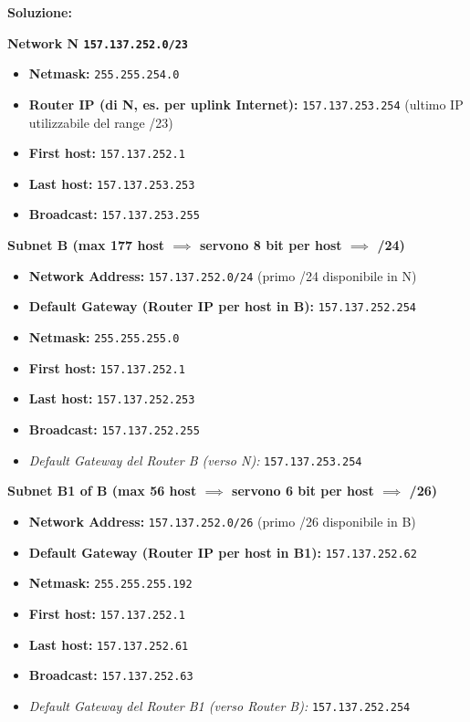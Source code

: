 \documentclass[12pt,a4paper]{article}
\newcommand{\TT}[1]{\texttt{#1}}
\begin{document}
\begin{enumerate}[label=\textbf{\arabic*.}, wide, labelindent=0pt, leftmargin=*]
    \textbf{Soluzione:}

    \textbf{Network N \TT{157.137.252.0/23}}
    \begin{itemize}[label=\textbullet]
        \item \textbf{Netmask:} \TT{255.255.254.0}
        \item \textbf{Router IP (di N, es. per uplink Internet):} \TT{157.137.253.254} (ultimo IP utilizzabile del range /23)
        \item \textbf{First host:} \TT{157.137.252.1}
        \item \textbf{Last host:} \TT{157.137.253.253}
        \item \textbf{Broadcast:} \TT{157.137.253.255}
    \end{itemize}

    \textbf{Subnet B (max 177 host $\implies$ servono 8 bit per host $\implies$ /24)}
    \begin{itemize}[label=\textbullet]
        \item \textbf{Network Address:} \TT{157.137.252.0/24} (primo /24 disponibile in N)
        \item \textbf{Default Gateway (Router IP per host in B):} \TT{157.137.252.254}
        \item \textbf{Netmask:} \TT{255.255.255.0}
        \item \textbf{First host:} \TT{157.137.252.1}
        \item \textbf{Last host:} \TT{157.137.252.253}
        \item \textbf{Broadcast:} \TT{157.137.252.255}
        \item \textit{Default Gateway del Router B (verso N):} \TT{157.137.253.254}
    \end{itemize}

    \textbf{Subnet B1 of B (max 56 host $\implies$ servono 6 bit per host $\implies$ /26)}
    \begin{itemize}[label=\textbullet]
        \item \textbf{Network Address:} \TT{157.137.252.0/26} (primo /26 disponibile in B)
        \item \textbf{Default Gateway (Router IP per host in B1):} \TT{157.137.252.62}
        \item \textbf{Netmask:} \TT{255.255.255.192}
        \item \textbf{First host:} \TT{157.137.252.1}
        \item \textbf{Last host:} \TT{157.137.252.61}
        \item \textbf{Broadcast:} \TT{157.137.252.63}
        \item \textit{Default Gateway del Router B1 (verso Router B):} \TT{157.137.252.254}
    \end{itemize}


\end{enumerate}
\end{document}
